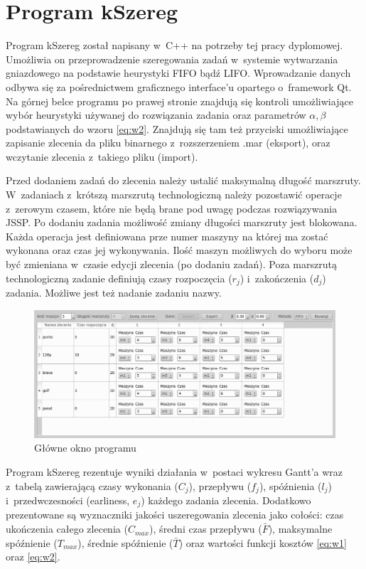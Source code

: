 \documentclass[twoside]{kInzynierka}
\begin{document}
\section        {Program kSzereg}
Program kSzereg został napisany w~C++ na potrzeby tej pracy dyplomowej. Umożliwia on przeprowadzenie szeregowania zadań w~systemie wytwarzania gniazdowego na podstawie heurystyki FIFO bądź LIFO. Wprowadzanie danych odbywa się za pośrednictwem graficznego interface'u opartego o~framework Qt. Na górnej belce programu po prawej stronie znajdują się kontroli umożliwiające wybór heurystyki używanej do rozwiązania zadania oraz parametrów \(\alpha, \beta\) podstawianych do wzoru \eqref{eq:w2}. Znajdują się tam też przyciski umożliwiające zapisanie zlecenia da pliku binarnego z~rozszerzeniem .mar (eksport), oraz wczytanie zlecenia z~takiego pliku (import). 

Przed dodaniem zadań do zlecenia należy ustalić maksymalną długość marszruty. W~zadaniach z~krótszą marszrutą technologiczną należy pozostawić operacje z~zerowym czasem, które nie będą brane pod uwagę podczas rozwiązywania JSSP. Po dodaniu zadania możliwość zmiany długości marszruty jest blokowana. Każda operacja jest definiowana prze numer maszyny na której ma zostać wykonana oraz czas jej wykonywania. Ilość maszyn możliwych do wyboru może być zmieniana w~czasie edycji zlecenia (po dodaniu zadań). Poza marszrutą technologiczną zadanie definiują czasy rozpoczęcia (\(r_j\)) i~zakończenia (\(d_j\)) zadania. Możliwe jest też nadanie zadaniu nazwy.

\begin{figure}[htb]
    \centering
    \includegraphics[width=\textwidth, keepaspectratio=true]{./obrazki/main}
    \caption{Główne okno programu}
\end{figure}

Program kSzereg rezentuje wyniki działania w~postaci wykresu Gantt'a wraz z~tabelą zawierającą czasy wykonania (\(C_j\)), przepływu (\(f_j\)), spóźnienia (\(l_j\)) i~przedwczesności (earliness, \(e_j\)) każdego zadania zlecenia. Dodatkowo prezentowane są wyznaczniki jakości uszeregowania zlecenia jako cołości: czas ukończenia całego zlecenia (\(C_{max}\)), średni czas przepływu (\( \bar{F} \)), maksymalne spóźnienie (\(T_{max}\)), średnie spóźnienie (\(\bar{T}\)) oraz wartości funkcji kosztów \eqref{eq:w1} oraz \eqref{eq:w2}.
\end{document}
